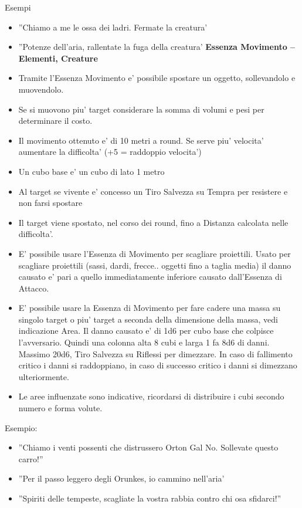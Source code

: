 \documentclass[a4paper,11pt,twoside,openany]{book}
\begin{document}
	Esempi
	\begin{itemize}
		\item 
		''Chiamo a me le ossa dei ladri. Fermate la creatura' 
		\item 
		''Potenze dell'aria, rallentate la fuga della creatura' 
		\textbf{Essenza Movimento -- Elementi, Creature}
		\item 
		Tramite l'Essenza Movimento e' possibile spostare un oggetto, sollevandolo e muovendolo. 
		\item 
		Se si muovono piu' target considerare la somma di volumi e pesi per determinare il costo. 
		\item 
		Il movimento ottenuto e' di 10 metri a round. Se serve piu' velocita' aumentare la difficolta' (+5 = raddoppio velocita') 
		\item 
		Un cubo base e' un cubo di lato 1 metro 
		\item 
		Al target se vivente e' concesso un Tiro Salvezza su Tempra per resistere e non farsi spostare 
		\item 
		Il target viene spostato, nel corso dei round, fino a Distanza calcolata nelle difficolta'. 
		\item 
		E' possibile usare l'Essenza di Movimento per scagliare proiettili. Usato per scagliare proiettili (sassi, dardi, frecce.. oggetti fino a taglia media) il danno causato e' pari a quello immediatamente inferiore causato dall'Essenza di Attacco. 
		\item 
		E' possibile usare la Essenza di Movimento per fare cadere una massa su singolo target o piu' target a seconda della dimensione della massa, vedi indicazione Area. Il danno causato e' di 1d6 per cubo base che colpisce l'avversario. Quindi una colonna alta 8 cubi e larga 1 fa 8d6 di danni. Massimo 20d6, Tiro Salvezza su Riflessi per dimezzare. In caso di fallimento critico i danni si raddoppiano, in caso di successo critico i danni si dimezzano ulteriormente. 
		\item 
		Le aree influenzate sono indicative, ricordarsi di distribuire i cubi secondo numero e forma volute. 
	\end{itemize}
	\bigskip
	
	
	Esempio:
	\begin{itemize}
		\item 
		''Chiamo i venti possenti che distrussero Orton Gal No. Sollevate questo carro!'' 
		\item 
		''Per il passo leggero degli Orunkes, io cammino nell'aria' 
		\item 
		''Spiriti delle tempeste, scagliate la vostra rabbia contro chi osa sfidarci!'' 
	\end{itemize}
	
\end{document}
